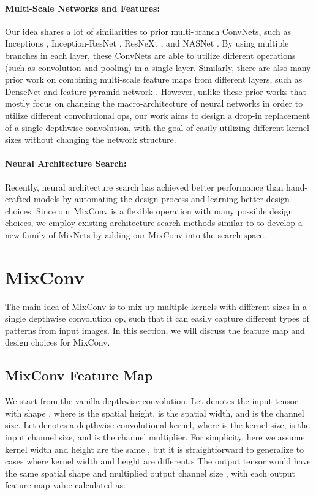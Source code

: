 \documentclass{sty/bmvc2k}
\begin{document}
\paragraph{Multi-Scale Networks and Features:} Our idea shares a lot of similarities to prior multi-branch ConvNets, such as Inceptions \cite{inceptionv316,inceptionv417}, Inception-ResNet \cite{inceptionresnet17}, ResNeXt \cite{resnext17}, and NASNet \cite{nas_imagenet18}. By using multiple branches in each layer, these ConvNets are able to utilize different operations (such as convolution and pooling) in a single layer. Similarly, there are also many prior work on combining multi-scale feature maps from different layers, such as DenseNet \cite{densenet17,multiscaledense18} and feature pyramid network \cite{fpn17}. However, unlike these prior works that mostly focus on changing the macro-architecture of neural networks in order to utilize different convolutional ops, our work aims to design a drop-in replacement of a single depthwise convolution, with the goal of easily utilizing different kernel sizes without changing the network structure.

\paragraph{Neural Architecture Search:} Recently, neural architecture search \cite{nas_cifar17,nas_imagenet18,pnas18,diffnas18,mnas19} has achieved better performance than hand-crafted models by automating the design process and learning better design choices. Since our MixConv is a flexible operation with many possible design choices,  we employ existing architecture search methods similar to \cite{mnas19,fbnet19,proxyless19} to develop a new family of MixNets by adding our MixConv into the search space.  \section{MixConv}
\label{sec:mixconv}

The main idea of MixConv is to mix up multiple kernels with different sizes in a single depthwise convolution op, such that it can easily capture different types of patterns from input images. In this section, we will discuss the feature map  and design choices for MixConv.

\subsection{MixConv Feature Map}
We start from the vanilla depthwise convolution. Let   denotes the input tensor with shape , where  is the spatial height,  is the spatial width, and  is the channel size. Let   denotes a depthwise convolutional kernel, where  is the kernel size,  is the input channel size, and  is the channel multiplier.
For simplicity, here we assume kernel width and height are the same , but it is straightforward to generalize to cases where kernel width and height are different.s
The output tensor  would have the same spatial shape  and multiplied output channel size , with each output feature map value calculated as:
\end{document}
